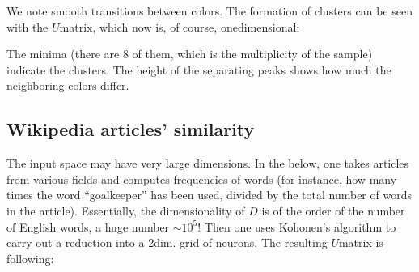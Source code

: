 \documentclass[letterpaper,10pt,english]{jupyterBook}
\begin{document}
\noindent{}

\sphinxAtStartPar
We note smooth transitions between colors. The formation of clusters can be seen with the \(U\)\sphinxhyphen{}matrix, which now is, of course, one\sphinxhyphen{}dimensional:

\begin{sphinxVerbatim}[commandchars=\\\{\}]

   
    \PYG{p}{[}\PYG{p}{]}\PYG{p}{[}\PYG{p}{]}\PYG{p}{[}\PYG{p}{]}\PYG{p}{[}\PYG{p}{]}\PYG{p}{[}\PYG{p}{]}
\end{sphinxVerbatim}

\noindent{}

\sphinxAtStartPar
The minima (there are 8 of them, which is the multiplicity of the sample) indicate the clusters. The height of the separating peaks shows how much the neighboring colors differ.


\subsection{Wikipedia articles’ similarity}
\label{\detokenize{docs/som:wikipedia-articles-similarity}}
\sphinxAtStartPar
The input space may have very large dimensions. In the  below, one takes articles from various fields and computes frequencies of words (for instance, how  many times the word “goalkeeper” has been used, divided by the total number of words in the article). Essentially, the dimensionality of \(D\) is of the order of the number of English words, a huge number \(\sim 10^5\)! Then one uses Kohonen’s algorithm to carry out a reduction into a 2\sphinxhyphen{}dim. grid of neurons. The resulting \(U\)\sphinxhyphen{}matrix is following:
\end{document}
